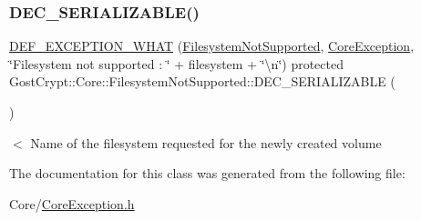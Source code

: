 \subsubsection{\texorpdfstring{D\+E\+C\+\_\+\+S\+E\+R\+I\+A\+L\+I\+Z\+A\+B\+L\+E()}{DEC\_SERIALIZABLE()}}
{\footnotesize\ttfamily \hyperlink{_gost_crypt_exception_8h_a5bc1e1c6c9d6f46c84eeba49e33355f9}{D\+E\+F\+\_\+\+E\+X\+C\+E\+P\+T\+I\+O\+N\+\_\+\+W\+H\+AT} (\hyperlink{class_gost_crypt_1_1_core_1_1_filesystem_not_supported}{Filesystem\+Not\+Supported}, \hyperlink{class_gost_crypt_1_1_core_1_1_core_exception}{Core\+Exception}, \char`\"{}Filesystem not supported \+: \char`\"{} + filesystem + \char`\"{}\textbackslash{}n\char`\"{}) protected Gost\+Crypt\+::\+Core\+::\+Filesystem\+Not\+Supported\+::\+D\+E\+C\+\_\+\+S\+E\+R\+I\+A\+L\+I\+Z\+A\+B\+LE (\begin{DoxyParamCaption}\item[{\hyperlink{class_gost_crypt_1_1_core_1_1_filesystem_not_supported}{Filesystem\+Not\+Supported}}]{ }\end{DoxyParamCaption})}

$<$ Name of the filesystem requested for the newly created volume 

The documentation for this class was generated from the following file\+:\begin{DoxyCompactItemize}
\item 
Core/\hyperlink{_core_exception_8h}{Core\+Exception.\+h}\end{DoxyCompactItemize}
